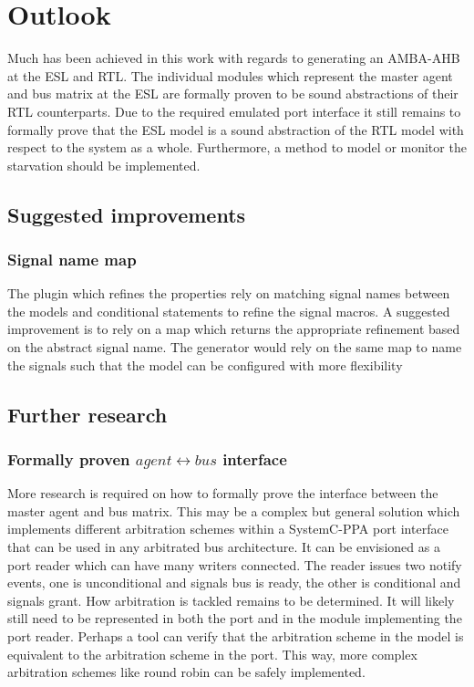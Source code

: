 \section{Outlook}
\label{sec:outl}
Much has been achieved in this work with regards to generating an AMBA-AHB at the ESL and RTL. The individual modules which represent the master agent and bus matrix at the ESL are formally proven to be sound abstractions of their RTL counterparts. Due to the required emulated port interface it still remains to formally prove that the ESL model is a sound abstraction of the RTL model with respect to the system as a whole. Furthermore, a method to model or monitor the starvation should be implemented.    

\subsection{Suggested improvements}
\label{sec:impr}
\subsubsection{Signal name map}
The plugin which refines the properties rely on matching signal names between the models and conditional statements to refine the signal macros. A suggested improvement is to rely on a map which returns the appropriate refinement based on the abstract signal name. The generator would rely on the same map to name the signals such that the model can be configured with more flexibility


\subsection{Further research}
\subsubsection{Formally proven $agent\leftrightarrow bus$ interface}
More research is required on how to formally prove the interface between the master agent and bus matrix. This may be a complex but general solution which implements different arbitration schemes within a SystemC-PPA port interface that can be used in any arbitrated bus architecture. It can be envisioned as a port reader which can have many writers connected. The reader issues two notify events, one is unconditional and signals bus is ready, the other is conditional and signals grant. How arbitration is tackled remains to be determined. It will likely still need to be represented in both the port and in the module implementing the port reader. Perhaps a tool can verify that the arbitration scheme in the model is equivalent to the arbitration scheme in the port. This way, more complex arbitration schemes like round robin can be safely implemented.  

